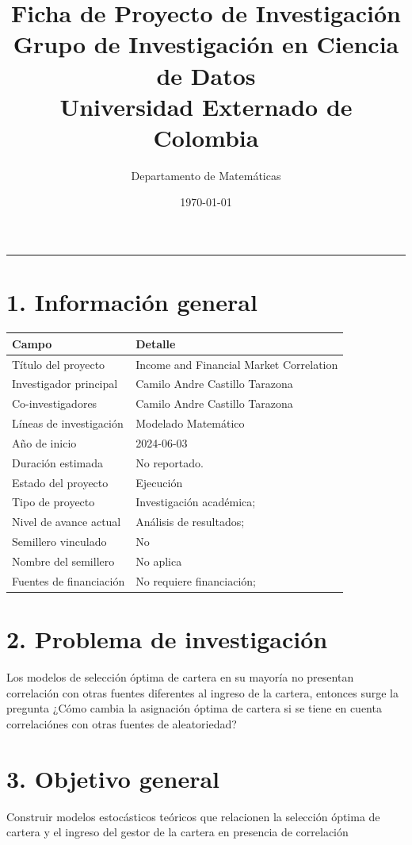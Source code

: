 \documentclass[a4paper,12pt]{article}
\title{
\vspace{-8mm}
\textbf{\textcolor{ExternadoGreen}{Ficha de Proyecto de Investigación}}\\
\large \textcolor{ExternadoDark}{Grupo de Investigación en Ciencia de Datos}\\
\large \textcolor{ExternadoDark}{Universidad Externado de Colombia}
}
\author{\textcolor{ExternadoDark}{Departamento de Matemáticas}}
\date{\textcolor{ExternadoDark}{\today}}
\begin{document}
\maketitle
\vspace{-3mm}
\noindent\textcolor{ExternadoDark}{\rule{\textwidth}{0.6pt}}

\section*{1. Información general}
\begin{longtable}{p{4.2cm} p{10.4cm}}
\toprule
\textbf{Campo} & \textbf{Detalle} \\
\midrule
Título del proyecto & Income and Financial Market Correlation \\
Investigador principal & Camilo Andre Castillo Tarazona \\
Co-investigadores & Camilo Andre Castillo Tarazona \\
Líneas de investigación & Modelado Matemático \\
Año de inicio & 2024-06-03 \\
Duración estimada & No reportado. \\
Estado del proyecto & Ejecución \\
Tipo de proyecto & Investigación académica; \\
Nivel de avance actual & Análisis de resultados; \\
Semillero vinculado & No \\
Nombre del semillero & No aplica \\
Fuentes de financiación & No requiere financiación; \\
\bottomrule
\end{longtable}

\section*{2. Problema de investigación}
Los modelos de selección óptima de cartera en su mayoría no presentan correlación con otras fuentes diferentes al ingreso de la cartera, entonces surge la pregunta ¿Cómo cambia la asignación óptima de cartera si se tiene en cuenta correlaciónes con otras fuentes de aleatoriedad?

\section*{3. Objetivo general}
Construir modelos estocásticos teóricos que relacionen la selección óptima de cartera y el ingreso del gestor de la cartera en presencia de correlación
\end{document}
